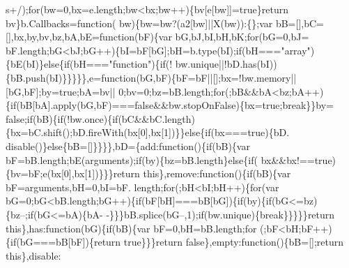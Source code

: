 \begin{DoxyCode}
      s+/);\textcolor{keywordflow}{for}(bw=0,bx=e.length;bw<bx;bw++)\{bv[e[bw]]=\textcolor{keyword}{true}\}\textcolor{keywordflow}{return} bv\}b.Callbacks=\textcolor{keyword}{function}(
      bw)\{bw=bw?(a2[bw]||X(bw)):\{\};var bB=[],bC=[],bx,by,bv,bz,bA,bE=\textcolor{keyword}{function}(bF)\{var bG,bJ,bI,bH,bK;\textcolor{keywordflow}{for}(bG=0,bJ=
      bF.length;bG<bJ;bG++)\{bI=bF[bG];bH=b.type(bI);\textcolor{keywordflow}{if}(bH===\textcolor{stringliteral}{"array"})\{bE(bI)\}\textcolor{keywordflow}{else}\{\textcolor{keywordflow}{if}(bH===\textcolor{stringliteral}{"function"})\{\textcolor{keywordflow}{if}(!
      bw.unique||!bD.has(bI))\{bB.push(bI)\}\}\}\}\},e=\textcolor{keyword}{function}(bG,bF)\{bF=bF||[];bx=!bw.memory||[bG,bF];by=\textcolor{keyword}{true};bA=bv||
      0;bv=0;bz=bB.length;\textcolor{keywordflow}{for}(;bB&&bA<bz;bA++)\{\textcolor{keywordflow}{if}(bB[bA].apply(bG,bF)===\textcolor{keyword}{false}&&bw.stopOnFalse)\{bx=\textcolor{keyword}{true};\textcolor{keywordflow}{break}\}\}by=\textcolor{keyword}{
      false};\textcolor{keywordflow}{if}(bB)\{\textcolor{keywordflow}{if}(!bw.once)\{\textcolor{keywordflow}{if}(bC&&bC.length)\{bx=bC.shift();bD.fireWith(bx[0],bx[1])\}\}\textcolor{keywordflow}{else}\{\textcolor{keywordflow}{if}(bx===\textcolor{keyword}{true})\{bD.
      disable()\}\textcolor{keywordflow}{else}\{bB=[]\}\}\}\},bD=\{add:\textcolor{keyword}{function}()\{\textcolor{keywordflow}{if}(bB)\{var bF=bB.length;bE(arguments);\textcolor{keywordflow}{if}(by)\{bz=bB.length\}\textcolor{keywordflow}{else}\{\textcolor{keywordflow}{if}(
      bx&&bx!==\textcolor{keyword}{true})\{bv=bF;e(bx[0],bx[1])\}\}\}\textcolor{keywordflow}{return} \textcolor{keyword}{this}\},\textcolor{keyword}{remove}:\textcolor{keyword}{function}()\{\textcolor{keywordflow}{if}(bB)\{var bF=arguments,bH=0,bI=bF.
      length;\textcolor{keywordflow}{for}(;bH<bI;bH++)\{\textcolor{keywordflow}{for}(var bG=0;bG<bB.length;bG++)\{\textcolor{keywordflow}{if}(bF[bH]===bB[bG])\{\textcolor{keywordflow}{if}(by)\{\textcolor{keywordflow}{if}(bG<=bz)\{bz--;\textcolor{keywordflow}{if}(bG<=bA)\{bA-
      -\}\}\}bB.splice(bG--,1);\textcolor{keywordflow}{if}(bw.unique)\{\textcolor{keywordflow}{break}\}\}\}\}\}\textcolor{keywordflow}{return} \textcolor{keyword}{this}\},has:\textcolor{keyword}{function}(bG)\{\textcolor{keywordflow}{if}(bB)\{var bF=0,bH=bB.length;\textcolor{keywordflow}{for}
      (;bF<bH;bF++)\{\textcolor{keywordflow}{if}(bG===bB[bF])\{\textcolor{keywordflow}{return} \textcolor{keyword}{true}\}\}\}\textcolor{keywordflow}{return} \textcolor{keyword}{false}\},empty:\textcolor{keyword}{function}()\{bB=[];\textcolor{keywordflow}{return} \textcolor{keyword}{this}\},disable:\textcolor{keyword}{
}
\end{DoxyCode}
